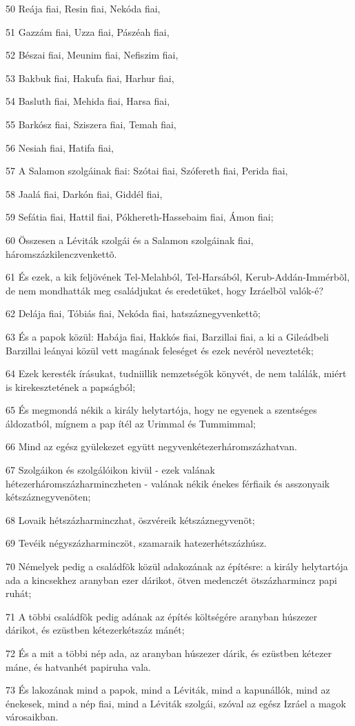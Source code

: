 \par 50 Reája fiai, Resin fiai, Nekóda fiai,
\par 51 Gazzám fiai, Uzza fiai, Pászéah fiai,
\par 52 Bészai fiai, Meunim fiai, Nefiszim fiai,
\par 53 Bakbuk fiai, Hakufa fiai, Harhur fiai,
\par 54 Basluth fiai, Mehida fiai, Harsa fiai,
\par 55 Barkósz fiai, Sziszera fiai, Temah fiai,
\par 56 Nesiah fiai, Hatifa fiai,
\par 57 A Salamon szolgáinak fiai: Szótai fiai, Szófereth fiai, Perida fiai,
\par 58 Jaalá fiai, Darkón fiai, Giddél fiai,
\par 59 Sefátia fiai, Hattil fiai, Pókhereth-Hassebaim fiai, Ámon fiai;
\par 60 Összesen a Léviták szolgái és a Salamon szolgáinak fiai, háromszázkilenczvenkettõ.
\par 61 És ezek, a kik feljövének Tel-Melahból, Tel-Harsából, Kerub-Addán-Immérbõl, de nem mondhatták meg családjukat és eredetüket, hogy Izráelbõl valók-é?
\par 62 Delája fiai, Tóbiás fiai, Nekóda fiai, hatszáznegyvenkettõ;
\par 63 És a papok közül: Habája fiai, Hakkós fiai, Barzillai fiai, a ki a Gileádbeli Barzillai leányai közül vett magának feleséget és ezek nevérõl nevezteték;
\par 64 Ezek keresték írásukat, tudniillik nemzetségök könyvét, de nem találák, miért is kirekesztetének a papságból;
\par 65 És megmondá nékik a király helytartója, hogy ne egyenek a szentséges áldozatból, mígnem a pap ítél az Urimmal és Tummimmal;
\par 66 Mind az egész gyülekezet együtt negyvenkétezerháromszázhatvan.
\par 67 Szolgáikon és szolgálóikon kivül - ezek valának hétezerháromszázharminczheten - valának nékik énekes férfiaik és asszonyaik kétszáznegyvenöten;
\par 68 Lovaik hétszázharminczhat, öszvéreik kétszáznegyvenöt;
\par 69 Tevéik négyszázharminczöt, szamaraik hatezerhétszázhúsz.
\par 70 Némelyek pedig a családfõk közül adakozának az építésre: a király helytartója ada a kincsekhez aranyban ezer dárikot, ötven medenczét ötszázharmincz papi ruhát;
\par 71 A többi családfõk pedig adának az építés költségére aranyban húszezer dárikot, és ezüstben kétezerkétszáz mánét;
\par 72 És a mit a többi nép ada, az aranyban húszezer dárik, és ezüstben kétezer máne, és hatvanhét papiruha vala.
\par 73 És lakozának mind a papok, mind a Léviták, mind a kapunállók, mind az énekesek, mind a nép fiai, mind a Léviták szolgái, szóval az egész Izráel a magok városaikban.


